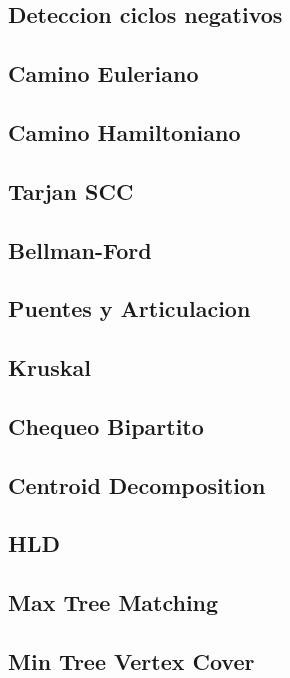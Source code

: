 \documentclass[a4paper,10pt,twocolumn]{article}
\begin{document}
\subsection{Deteccion ciclos negativos}

\subsection{Camino Euleriano}

\subsection{Camino Hamiltoniano}

\subsection{Tarjan SCC}

\subsection{Bellman-Ford}

\subsection{Puentes y Articulacion}

\subsection{Kruskal}

\subsection{Chequeo Bipartito}

\subsection{Centroid Decomposition}

\subsection{HLD}

\subsection{Max Tree Matching}

\subsection{Min Tree Vertex Cover}

\end{document}
